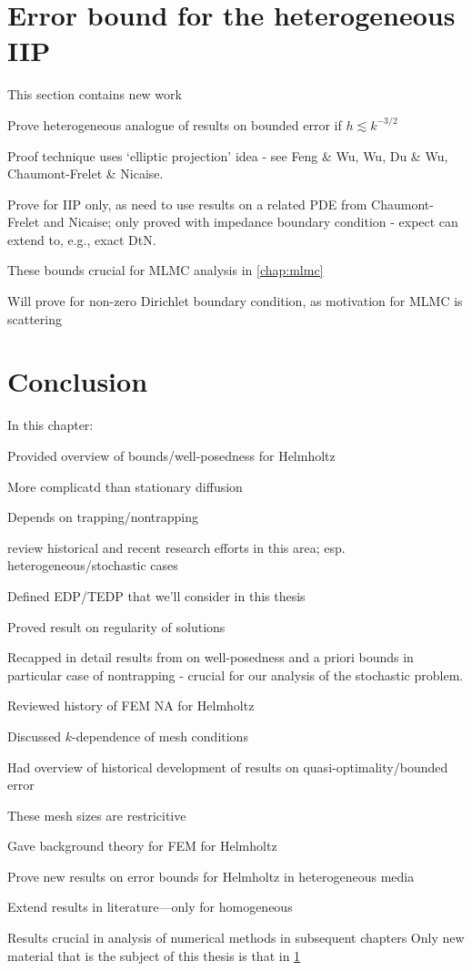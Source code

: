 \section{Error bound for the heterogeneous IIP}\label{sec:backgroundbounds}
\bit
\item This section contains new work
\item Prove heterogeneous analogue of results on bounded error if $h \lesssim k^{-3/2}$
\item Proof technique uses `elliptic projection' idea - see Feng \& Wu, Wu, Du \& Wu, Chaumont-Frelet \& Nicaise.
\item Prove for IIP only, as need to use results on a related PDE from Chaumont-Frelet and Nicaise; only proved with impedance boundary condition - expect can extend to, e.g., exact DtN.
\item These bounds crucial for MLMC analysis in \cref{chap:mlmc}
\item Will prove for non-zero Dirichlet boundary condition, as motivation for MLMC is scattering
\eit
\section{Conclusion}
In this chapter:
\bit
\item Provided overview of bounds/well-posedness for Helmholtz
\bit
\item More complicatd than stationary diffusion
\item Depends on trapping/nontrapping
\item review historical and recent research efforts in this area; esp. heterogeneous/stochastic cases
\eit
\item Defined EDP/TEDP that we'll consider in this thesis
\item Proved result on regularity of solutions
\item Recapped in detail results from \cite{GrPeSp:19} on well-posedness and a priori bounds in particular case of nontrapping - crucial for our analysis of the stochastic problem.
\item Reviewed history of FEM NA for Helmholtz
\bit
\item Discussed $k$-dependence of mesh conditions
\item Had overview of historical development of results on quasi-optimality/bounded error
\item These mesh sizes are restricitive
\eit
\item Gave background theory for FEM for Helmholtz
\item Prove new results on error bounds for Helmholtz in heterogeneous media
\bit
\item Extend results in literature---only for homogeneous
\item Results crucial in analysis of numerical methods in subsequent chapters
\eit
Only new material that is the subject of this thesis is that in \cref{sec:backgroundbounds}
\eit
{}
